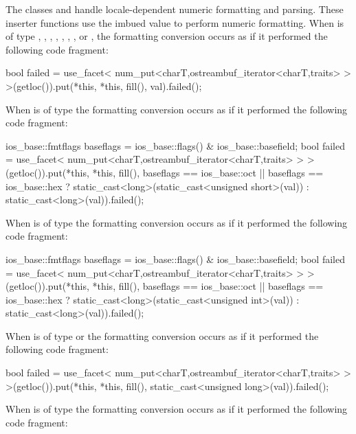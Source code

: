 \begin{itemdescr}
\pnum
\effects
The classes
and
handle locale-dependent numeric formatting and
parsing.
These inserter functions use the imbued
value to perform numeric formatting.
When 
is of type
,
,
,
, ,
,
,
or
,
the formatting conversion occurs as if it performed the following code fragment:
\begin{codeblock}
bool failed = use_facet<
  num_put<charT,ostreambuf_iterator<charT,traits> >
    >(getloc()).put(*this, *this, fill(), val).failed();
\end{codeblock}

When  is of type
the formatting conversion occurs as if it performed the following code fragment:
\begin{codeblock}
ios_base::fmtflags baseflags = ios_base::flags() & ios_base::basefield;
bool failed = use_facet<
  num_put<charT,ostreambuf_iterator<charT,traits> >
    >(getloc()).put(*this, *this, fill(),
    baseflags == ios_base::oct || baseflags == ios_base::hex
      ? static_cast<long>(static_cast<unsigned short>(val))
      : static_cast<long>(val)).failed();
\end{codeblock}

When  is of type
the formatting conversion occurs as if it performed the following code fragment:
\begin{codeblock}
ios_base::fmtflags baseflags = ios_base::flags() & ios_base::basefield;
bool failed = use_facet<
  num_put<charT,ostreambuf_iterator<charT,traits> >
    >(getloc()).put(*this, *this, fill(),
    baseflags == ios_base::oct || baseflags == ios_base::hex
      ? static_cast<long>(static_cast<unsigned int>(val))
      : static_cast<long>(val)).failed();
\end{codeblock}

When  is of type
or
the formatting conversion occurs as if it performed the following code fragment:
\begin{codeblock}
bool failed = use_facet<
  num_put<charT,ostreambuf_iterator<charT,traits> >
    >(getloc()).put(*this, *this, fill(),
      static_cast<unsigned long>(val)).failed();
\end{codeblock}

When  is of type
the formatting conversion occurs as if it performed the following code fragment:
\begin{codeblock}
bool failed = use_facet<
  num_put<charT,ostreambuf_iterator<charT,traits> >
    >(getloc()).put(*this, *this, fill(),
      static_cast<double>(va})).failed();
\end{codeblock}


\end{itemdescr}

